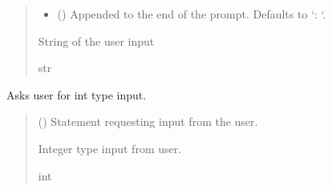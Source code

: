 \documentclass[letterpaper,10pt,english]{sphinxmanual}
\begin{document}
\begin{fulllineitems}
\begin{fulllineitems}
\begin{quote}
\begin{description}
\begin{itemize}
\item {} 
\sphinxAtStartPar
{} (\sphinxstyleliteralemphasis{\sphinxupquote{, }}) \textendash{} Appended to the end of the prompt. Defaults to ‘: ‘.

\end{itemize}

\sphinxAtStartPar
String of the user input

\sphinxAtStartPar
str

\end{description}\end{quote}

\end{fulllineitems}


\begin{fulllineitems}
\label{\detokenize{Setup.Inputs:Setup.Inputs.GetUserInput.UserInput.AskForInt}}
\pysigstartsignatures
{}
\pysigstopsignatures
\sphinxAtStartPar
Asks user for int type input.
\begin{quote}\begin{description}
\sphinxAtStartPar
{} () \textendash{} Statement requesting input from the user.

\sphinxAtStartPar
Integer type input from user.

\sphinxAtStartPar
int

\end{description}\end{quote}

\end{fulllineitems}



\end{fulllineitems}
\end{document}
